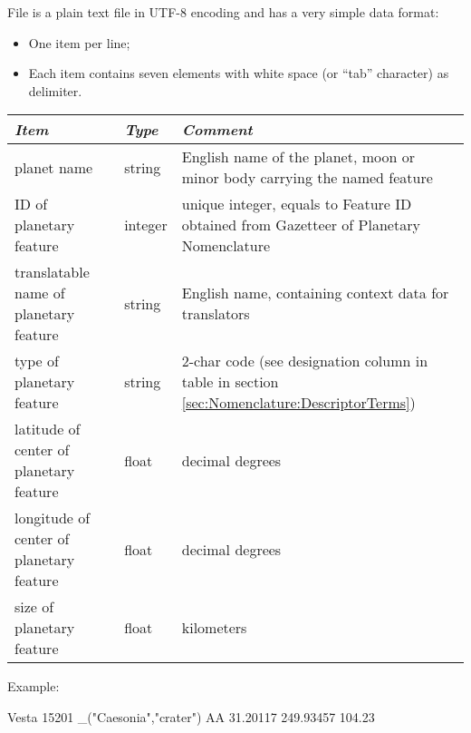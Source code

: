 File  is a plain text file in UTF-8 encoding and has a very simple data format: 
\begin{itemize}
\item One item per line;
\item Each item contains seven elements with white space (or ``tab'' character) as delimiter.
\end{itemize}

\begin{longtabu} to \textwidth {l|l|X}\toprule
\emph{Item}                              & \emph{Type} & \emph{Comment}\\\midrule
planet name                              & string  & English name of the planet, moon or minor body carrying the named feature\\\midrule
ID of planetary feature                  & integer & unique integer, equals to Feature ID obtained from Gazetteer of Planetary Nomenclature\\\midrule
translatable name of planetary feature   & string  & English name, containing context data for translators\\\midrule
type of planetary feature                & string  & 2-char code (see designation column in table in section \ref{sec:Nomenclature:DescriptorTerms})\\\midrule
latitude of center of planetary feature  & float   & decimal degrees\\\midrule
longitude of center of planetary feature & float   & decimal degrees\\\midrule
size of planetary feature                & float   & kilometers\\\bottomrule
\end{longtabu}

Example:
\begin{configfile}
Vesta 15201 _("Caesonia","crater") AA 31.20117 249.93457 104.23
\end{configfile}

